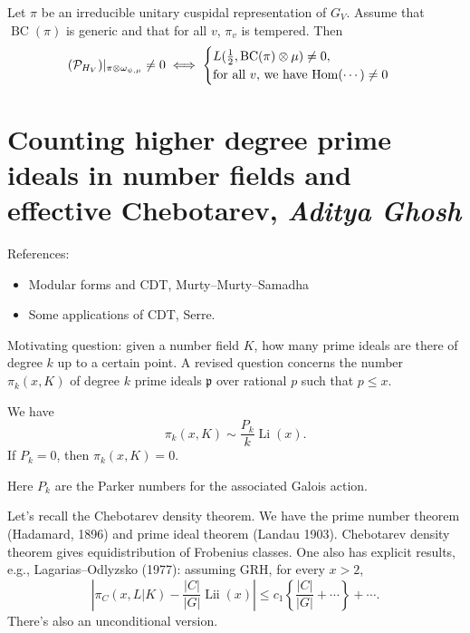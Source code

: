 \documentclass[reqno]{amsart} 
\begin{document}
\begin{corollary}
  Let $\pi$ be an irreducible unitary cuspidal representation of $G_{V}$.  Assume that $\operatorname{BC}(\pi)$ is generic and that for all $v$, $\pi_v$ is tempered.  Then
  \begin{equation*}
    (\mathcal{P}_{H_V}) |_{\pi \otimes \omega_{\psi, \mu}} \neq 0
    \iff
    \begin{cases}
      L(\tfrac{1}{2}, \operatorname{BC}(\pi) \otimes \mu) \neq 0,      &  \\
      \text{for all $v$, we have $\operatorname{Hom} (\dotsb) \neq 0$}                                                                       & 
    \end{cases}
  \end{equation*}
\end{corollary}

\section{Counting higher degree prime ideals in number fields and effective Chebotarev, \textnormal{\emph{Aditya Ghosh}}}
References:
\begin{itemize}
\item Modular forms and CDT, Murty--Murty--Samadha
\item Some applications of CDT, Serre.
\end{itemize}

Motivating question: given a number field $K$, how many prime ideals are there of degree $k$ up to a certain point.  A revised question concerns the number $\pi_k(x, K)$ of degree $k$ prime ideals $\mathfrak{p}$ over rational $p$ such that $p \leq x$.

\begin{theorem}[Breuillard--G, 2023]
  We have
  \begin{equation*}
    \pi_k(x, K) \sim \frac{P_k}{k} \operatorname{Li}(x).
  \end{equation*}
  If $P_k = 0$, then $\pi_k(x, K) = 0$.
\end{theorem}
Here $P_k$ are the Parker numbers for the associated Galois action.

Let's recall the Chebotarev density theorem.  We have the prime number theorem (Hadamard, 1896) and prime ideal theorem (Landau 1903).  Chebotarev density theorem gives equidistribution of Frobenius classes.  One also has explicit results, e.g., Lagarias--Odlyzsko (1977): assuming GRH, for every $x > 2$,
\begin{equation*}
  \left| \pi_{C}(x, L|K)
    - \frac{\lvert C \rvert}{ \lvert G \rvert} \operatorname{Lii}(x)
  \right|
  \leq
  c_1
  \left\{ \frac{\lvert C \rvert}{\lvert G \rvert}  + \dotsb \right\} + \dotsb.
\end{equation*}
There's also an unconditional version.
\end{document}
